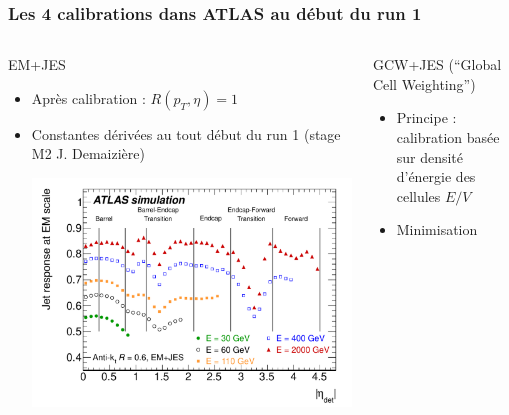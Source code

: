 \begin{frame}
\frametitle{Les 4 calibrations dans ATLAS au d\'ebut du run 1}

\vspace*{-0.3cm}
\begin{columns}
\begin{column}{0.5\textwidth}
\begin{block}{EM+JES}
\begin{itemize}
\item Apr\`es calibration : $R(p_T,\eta)=1$
\item Constantes d\'eriv\'ees au tout d\'ebut du run 1 (stage M2 J. Demaizi\`ere)
\begin{center}
\includegraphics[scale=0.2]{Figures/JES/fig_09_responseEMscaleVsEta.pdf}
\end{center}
\end{itemize}
\end{block}
\end{column}
\pause
\begin{column}{0.55\textwidth}
{
\begin{block}{GCW+JES {\small (``Global Cell Weighting'')}}
\begin{itemize}
\item Principe : calibration bas\'ee sur densit\'e d'\'energie des cellules $E/V$
\item Minimisation \\
\begin{scriptsize}

\end{scriptsize}
\end{itemize}
\end{block}}
\end{column}
\end{columns}
\end{frame}
